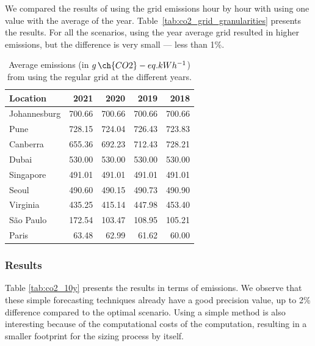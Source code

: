 We compared the results of using the grid emissions hour by hour with using one value with the average of the year. Table~\ref{tab:co2_grid_granularities} presents the results. For all the scenarios, using the  year average grid  resulted in higher emissions, but the difference is very small --- less than 1\%.





\begin{table}
  
  \caption{Average emissions (in $g\,\ch{CO2}-eq.kWh^{-1}$) from using the regular grid at the different years.}\label{tab:carbonfootprint} \centering
  \begin{tabular}{|l|r|r|r|r|}    
  \hline   
  \textbf{Location} &  \textbf{2021} & \textbf{2020} & \textbf{2019} & \textbf{2018}\\
  \hline
  Johannesburg & 700.66 & 700.66 & 700.66 & 700.66  \\
  \hline
  Pune & 728.15 & 724.04 & 726.43 & 723.83     \\
  \hline
  Canberra & 655.36 & 692.23 & 712.43 & 728.21\\
  \hline
  Dubai & 530.00  & 530.00 & 530.00 & 530.00     \\
  \hline
  Singapore & 491.01 & 491.01 & 491.01 & 491.01 \\
  \hline     
  Seoul & 490.60 & 490.15 & 490.73 & 490.90     \\
  \hline
  Virginia  & 435.25 & 415.14 & 447.98 & 453.40 \\
  \hline
  São Paulo &  172.54 &  103.47 & 108.95 &  105.21 \\
  \hline 
  Paris &  63.48  & 62.99 & 61.62   & 60.00   \\
  \hline  

\end{tabular}  
\end{table}


\subsubsection{Results}

Table \ref{tab:co2_10y} presents the results in terms of  emissions. We observe that these simple forecasting techniques already have a good precision value, up to 2\% difference compared to the optimal scenario. Using a simple method is also interesting because of the computational costs of the computation, resulting in a smaller  footprint for the sizing process by itself.

